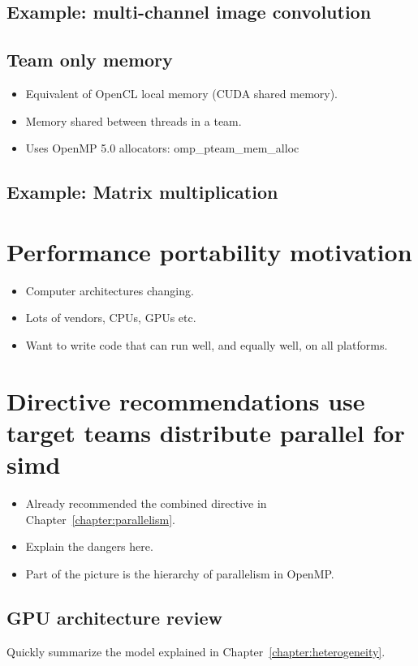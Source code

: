 \subsection{Example: multi-channel image convolution}

\subsection{Team only memory}
\begin{itemize}
  \item Equivalent of OpenCL local memory (CUDA shared memory).
  \item Memory shared between threads in a team.
  \item Uses OpenMP 5.0 allocators: omp\_pteam\_mem\_alloc
\end{itemize}
\subsection{Example: Matrix multiplication}

\section{Performance portability motivation}
\begin{itemize}
  \item Computer architectures changing.
  \item Lots of vendors, CPUs, GPUs etc.
  \item Want to write code that can run well, and equally well, on all platforms.
\end{itemize}


\section{Directive recommendations use target teams distribute parallel for simd}
\begin{itemize}
  \item Already recommended the combined directive in Chapter~\ref{chapter:parallelism}.
  \item Explain the dangers here.
  \item Part of the picture is the hierarchy of parallelism in OpenMP.
\end{itemize}

\subsection{GPU architecture review}
Quickly summarize the model explained in Chapter~\ref{chapter:heterogeneity}.

